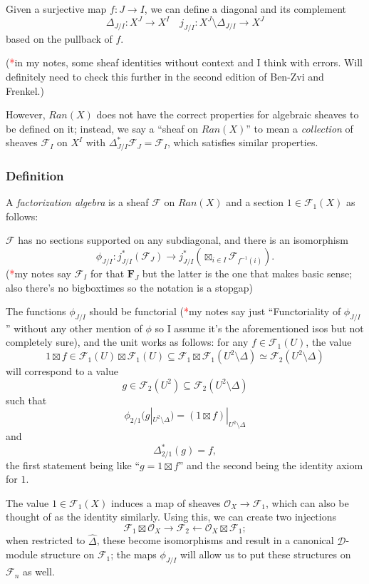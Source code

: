 \documentclass{article}
\newcommand{\FF}{\mathbold{F}}
\newcommand{\Oo}{\mathcal{O}}
\newcommand{\Dd}{\mathcal{D}}
\newcommand{\Ff}{\mathcal{F}}
\newcommand{\tk}{\textcolor{red}{*}}
\begin{document}
Given a surjective map $f: J \rightarrow I$, we can define a diagonal and its complement
\[\Delta_{J/I}: X^J \rightarrow X^I \quad j_{J/I}: X^J \setminus \Delta_{J/I} \rightarrow X^J \]
based on the pullback of $f$.

(\tk in my notes, some sheaf identities without context and I think with errors.  Will definitely need to check this further in the second edition of Ben-Zvi and Frenkel.)

However, $Ran(X)$ does not have the correct properties for algebraic sheaves to be defined on it; instead, we say a ``sheaf on $Ran(X)$'' to mean a \textit{collection} of sheaves $\Ff_I$ on $X^I$ with $\Delta_{J/I}^*\Ff_J=\Ff_I$, which satisfies similar properties.

\subsubsection{Definition}
A \textit{factorization algebra} is a sheaf $\Ff$ on $Ran(X)$ and a section $1 \in \Ff_1(X)$ as follows:

$\Ff$ has no sections supported on any subdiagonal, and there is an isomorphism
\[\phi_{J/I}: j_{J/I}^*(\Ff_J) \rightarrow j_{J/I}^*(\boxtimes_{i \in I}\Ff_{f^{-1}(i)}). \]
(\tk my notes say $\Ff_I$ for that $\FF_J$ but the latter is the one that makes basic sense; also there's no bigboxtimes so the notation is a stopgap)

The functions $\phi_{J/I}$ should be functorial (\tk my notes say just ``Functoriality of $\phi_{J/I}$'' without any other mention of $\phi$ so I assume it's the aforementioned isos but not completely sure), and the unit works as follows: for any $f \in \Ff_1(U)$, the value \[1 \boxtimes f \in \Ff_1(U) \boxtimes \Ff_1(U) \subseteq \Ff_1 \boxtimes \Ff_1(U^2 \setminus \Delta) \simeq \Ff_2(U^2 \setminus \Delta)\] will correspond to a value
\[g \in \Ff_2(U^2) \subseteq \Ff_2(U^2 \setminus \Delta) \]
such that \[\phi_{2/1}(g|_{U^2 \setminus \Delta})=(1 \boxtimes f)|_{U^2 \setminus \Delta}\] and
\[\Delta_{2/1}^*(g)=f, \]
the first statement being like ``$g=1 \boxtimes f$'' and the second being the identity axiom for $1$.

The value $1 \in \Ff_1(X)$ induces a map of sheaves $\Oo_X \rightarrow \Ff_1$, which can also be thought of as the identity similarly.  Using this, we can create two injections
\[\Ff_1 \boxtimes \Oo_X \rightarrow \Ff_2 \leftarrow \Oo_X \boxtimes \Ff_1; \]
when restricted to $\widehat{\Delta}$, these become isomorphisms and result in a canonical $\Dd$-module structure on $\Ff_1$; the maps $\phi_{J/I}$ will allow us to put these structures on $\Ff_n$ as well.
\end{document}
